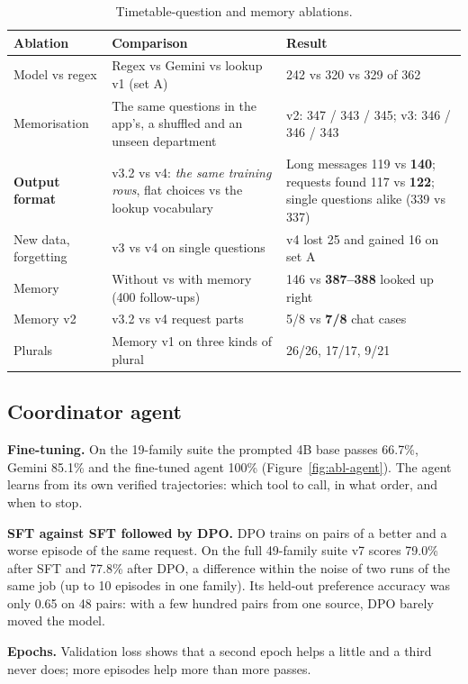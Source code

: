 \documentclass[11pt,a4paper]{article}
\newcommand{\best}[1]{\textbf{#1}}
\begin{document}
\begin{table}[!htb]
\centering\small
\begin{tabularx}{\textwidth}{@{}L{3.0cm} L{4.6cm} Y@{}}
\toprule
\textbf{Ablation} & \textbf{Comparison} & \textbf{Result}\\
\midrule
Model vs regex & Regex vs Gemini vs lookup v1 (set A) & 242 vs 320 vs 329 of 362\\
Memorisation & The same questions in the app's, a shuffled and an unseen department & v2: 347 / 343 / 345; v3: 346 / 346 / 343\\
\textbf{Output format} & v3.2 vs v4: \emph{the same training rows}, flat choices vs the lookup vocabulary & Long messages 119 vs \best{140}; requests found 117 vs \best{122}; single questions alike (339 vs 337)\\
New data, forgetting & v3 vs v4 on single questions & v4 lost 25 and gained 16 on set A\\
Memory & Without vs with memory (400 follow-ups) & 146 vs \best{387--388} looked up right\\
Memory v2 & v3.2 vs v4 request parts & 5/8 vs \best{7/8} chat cases\\
Plurals & Memory v1 on three kinds of plural & 26/26, 17/17, 9/21\\
\bottomrule
\end{tabularx}
\caption{Timetable-question and memory ablations.}
\label{tab:abl-chat}
\end{table}

\subsection{Coordinator agent}
\textbf{Fine-tuning.} On the 19-family suite the prompted 4B base passes 66.7\%, Gemini 85.1\% and the fine-tuned agent
100\% (Figure~\ref{fig:abl-agent}). The agent learns from its own verified trajectories: which tool to call, in what
order, and when to stop.

\textbf{SFT against SFT followed by DPO.} DPO trains on pairs of a better and a worse episode of the same request. On
the full 49-family suite v7 scores 79.0\% after SFT and 77.8\% after DPO, a difference within the noise of two runs of
the same job (up to 10 episodes in one family). Its held-out preference accuracy was only 0.65 on 48 pairs: with a
few hundred pairs from one source, DPO barely moved the model.

\textbf{Epochs.} Validation loss shows that a second epoch helps a little and a third never does; more episodes help
more than more passes.
\end{document}
